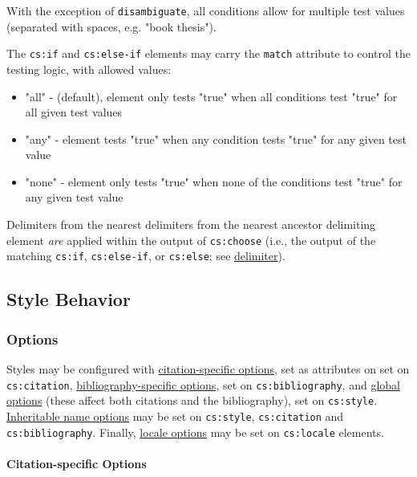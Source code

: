 With the exception of \texttt{disambiguate}, all conditions allow for
multiple test values (separated with spaces, e.g. "book thesis").

The \texttt{cs:if} and \texttt{cs:else-if} elements may carry the
\texttt{match} attribute to control the testing logic, with allowed
values:

\begin{itemize}
\tightlist
\item
  "all" - (default), element only tests "true" when all conditions test
  "true" for all given test values
\item
  "any" - element tests "true" when any condition tests "true" for any
  given test value
\item
  "none" - element only tests "true" when none of the conditions test
  "true" for any given test value
\end{itemize}

Delimiters from the nearest delimiters from the nearest ancestor
delimiting element \emph{are} applied within the output of
\texttt{cs:choose} (i.e., the output of the matching \texttt{cs:if},
\texttt{cs:else-if}, or \texttt{cs:else}; see
\protect\hyperlink{delimiter}{delimiter}).

\hypertarget{style-behavior}{%
\subsection{Style Behavior}\label{style-behavior}}

\hypertarget{options}{%
\subsubsection{Options}\label{options}}

Styles may be configured with
\protect\hyperlink{citation-specific-options}{citation-specific
options}, set as attributes on set on \texttt{cs:citation},
\protect\hyperlink{bibliography-specific-options}{bibliography-specific
options}, set on \texttt{cs:bibliography}, and
\protect\hyperlink{global-options}{global options} (these affect both
citations and the bibliography), set on \texttt{cs:style}.
\protect\hyperlink{inheritable-name-options}{Inheritable name options}
may be set on \texttt{cs:style}, \texttt{cs:citation} and
\texttt{cs:bibliography}. Finally,
\protect\hyperlink{locale-options}{locale options} may be set on
\texttt{cs:locale} elements.

\hypertarget{citation-specific-options}{%
\paragraph{Citation-specific Options}\label{citation-specific-options}}

